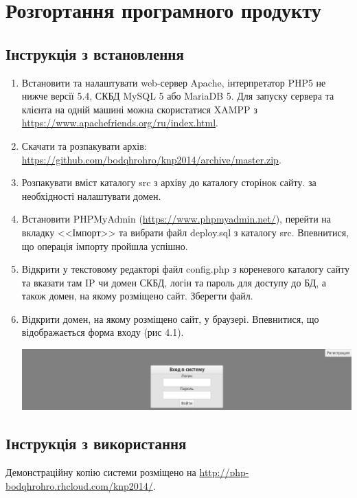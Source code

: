 \newpage
\section{Розгортання програмного продукту}
\subsection{Інструкція з встановлення}
\bigbreak
\begin{sloppy}
\begin{enumerate}
\item Встановити та налаштувати web-сервер Apache, інтерпретатор PHP5 не нижче версії 5.4, СКБД MySQL 5 або MariaDB 5. Для запуску сервера та клієнта на одній машині можна скористатися XAMPP з \url{https://www.apachefriends.org/ru/index.html}.
\item Скачати та розпакувати архів: \url{https://github.com/bodqhrohro/knp2014/archive/master.zip}.
\item Розпакувати вміст каталогу src з архіву до каталогу сторінок сайту. за необхідності налаштувати домен.
\item Встановити PHPMyAdmin (\url{https://www.phpmyadmin.net/}), перейти на вкладку <<Імпорт>> та вибрати файл deploy.sql з каталогу src. Впевнитися, що операція імпорту пройшла успішно.
\item Відкрити у текстовому редакторі файл config.php з кореневого каталогу сайту та вказати там IP чи домен СКБД, логін та пароль для доступу до БД, а також домен, на якому розміщено сайт. Зберегти файл.
\item Відкрити домен, на якому розміщено сайт, у браузері. Впевнитися, що відображається форма входу (рис 4.1).

\noindent\includegraphics[width=17cm]{scrns/login.png}
\end{enumerate}
\end{sloppy}
\bigbreak
\subsection{Інструкція з використання}
\bigbreak
Демонстраційну копію системи розміщено на \url{http://php-bodqhrohro.rhcloud.com/knp2014/}.

